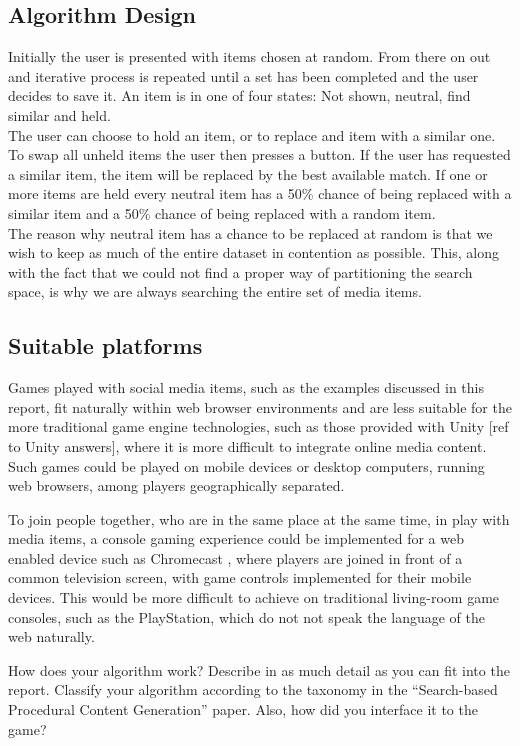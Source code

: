 \documentclass[]{article}
\begin{document}
\subsection{Algorithm Design}
\label{sec:AlgorithmDesign}
Initially the user is presented with items chosen at random. From there on out and iterative process is repeated until a set has been completed and the user decides to save it.
An item is in one of four states: Not shown, neutral, find similar and held.\\
The user can choose to hold an item, or to replace and item with a similar one. To swap all unheld items the user then presses a button. If the user has requested a similar item, the item will be replaced by the best available match. If one or more items are held every neutral item has a 50\% chance of being replaced with a similar item and a 50\% chance of being replaced with a random item.\\
The reason why neutral item has a chance to be replaced at random is that we wish to keep as much of the entire dataset in contention as possible. This, along with the fact that we could not find a proper way of partitioning the search space, is why we are always searching the entire set of media items.

\subsection{Suitable platforms}

Games played with social media items, such as the examples discussed in this report, fit naturally within web browser environments and are less suitable for the more traditional game engine technologies, such as those provided with Unity [ref to Unity answers], where it is more difficult to integrate online media content.  Such games could be played on mobile devices or desktop computers, running web browsers, among players geographically separated.  

To join people together, who are in the same place at the same time, in play with media items, a console gaming experience could be implemented for a web enabled device such as Chromecast \cite{ChromecastGames}, where players are joined in front of a common television screen, with game controls implemented for their mobile devices.  This would be more difficult to achieve on traditional living-room game consoles, such as the PlayStation, which do not not speak the language of the web naturally.

\begin{framed}
How does your algorithm work? Describe in as much detail as you can fit into the report. Classify your algorithm according to the taxonomy in the “Search-based Procedural Content Generation” paper. Also, how did you interface it to the game?
\end{framed}
\end{document}
